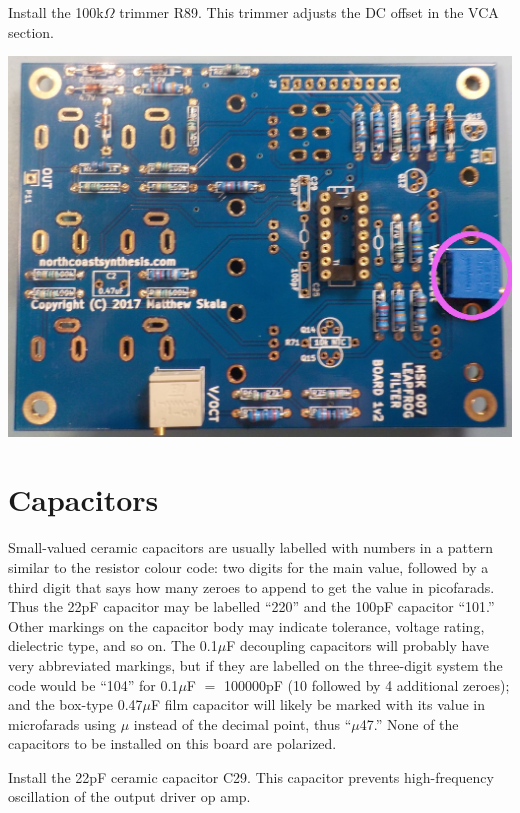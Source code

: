 \pagebreak

Install the 100k$\Omega$ trimmer R89.  This trimmer adjusts the DC offset in
the VCA section.

\nopagebreak
\noindent\includegraphics[width=\linewidth]{pot-100k1.jpg}

\section{Capacitors}

Small-valued ceramic capacitors are usually labelled with numbers in a
pattern similar to the resistor colour code:  two digits for the main value,
followed by a third digit that says how many zeroes to append to get the
value in picofarads.  Thus the 22pF capacitor may be labelled ``220'' and
the 100pF capacitor ``101.''  Other markings on the capacitor body may
indicate tolerance, voltage rating, dielectric type, and so on.  The
0.1$\mu$F decoupling capacitors will probably have very abbreviated markings,
but if they are labelled on the three-digit system the code would be ``104''
for 0.1$\mu$F $=$ 100000pF (10 followed by 4 additional zeroes);
and the box-type 0.47$\mu$F film capacitor will likely be marked with its
value in microfarads using $\mu$ instead of the decimal point, thus
``$\mu$47.''  None of the capacitors to be installed on this board are
polarized.

\pagebreak

Install the 22pF ceramic capacitor C29.  This capacitor prevents
high-frequency oscillation of the output driver op amp.

